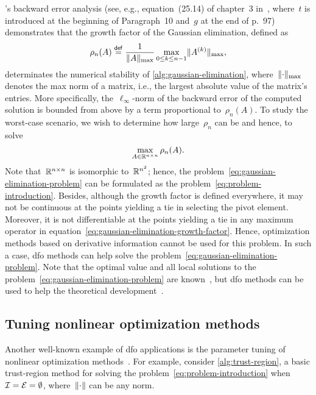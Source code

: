 's backward error analysis (see, e.g., equation~(25.14) of chapter~3 in~\cite{Wilkinson_1963}, where~$t$ is introduced at the beginning of Paragraph~10 and~$g$ at the end of p.~97) demonstrates that the growth factor of the Gaussian elimination, defined as
\begin{equation}
    \label{eq:gaussian-elimination-growth-factor}
    \rho_n(A) \mathrel{\stackrel{\mathsf{def}}{=}} \frac{1}{\lVert A\rVert_{\max}} \max_{0 \le k \le n - 1} \lVert A^{(k)}\rVert_{\max},
\end{equation}
%
determinates the numerical stability of \cref{alg:gaussian-elimination}, where~$\lVert\cdot\rVert_{\max}$ denotes the max norm of a matrix, i.e., the largest absolute value of the matrix's entries.
More specifically, the~$\ell_{\infty}$-norm of the backward error of the computed solution is bounded from above by a term proportional to~$\rho_n(A)$.
To study the worst-case scenario, we wish to determine how large~$\rho_n$ can be and hence, to solve
\begin{equation}
    \label{eq:gaussian-elimination-problem}
    \max_{A \in \mathbb{R}^{n \times n}} \rho_n(A).
\end{equation}
Note that~$\mathbb{R}^{n \times n}$ is isomorphic to~$\mathbb{R}^{n^2}$; hence, the problem~\cref{eq:gaussian-elimination-problem} can be formulated as the problem~\cref{eq:problem-introduction}.
Besides, although the growth factor is defined everywhere, it may not be continuous at the points yielding a tie in selecting the pivot element.
Moreover, it is not differentiable at the points yielding a tie in any maximum operator in equation~\cref{eq:gaussian-elimination-growth-factor}.
Hence, optimization methods based on derivative information cannot be used for this problem.
In such a case, \gls{dfo} methods can help solve the problem~\cref{eq:gaussian-elimination-problem}.
Note that the optimal value and all local solutions to the problem~\cref{eq:gaussian-elimination-problem} are known~\cite{Higham_Higham_1989}, but \gls{dfo} methods can be used to help the theoretical development~\cite{Higham_1993}.

\subsection{Tuning nonlinear optimization methods}
\label{subsec:tuning-nonlinear-optimization-methods}

Another well-known example of \gls{dfo} applications is the parameter tuning of nonlinear optimization methods~\cite{Audet_Orban_2006}.
For example, consider \cref{alg:trust-region}, a basic trust-region method for solving the problem~\cref{eq:problem-introduction} when~$\mathcal{I} = \mathcal{E} = \emptyset$, where~$\lVert\cdot\rVert$ can be any norm.

